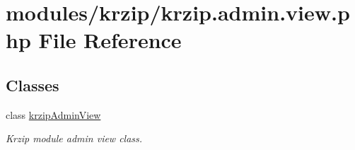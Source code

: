 \hypertarget{krzip_8admin_8view_8php}{\section{modules/krzip/krzip.admin.\-view.\-php File Reference}
\label{krzip_8admin_8view_8php}
}
\subsection*{Classes}
\begin{DoxyCompactItemize}
\item 
class \hyperlink{classkrzipAdminView}{krzip\-Admin\-View}
\begin{DoxyCompactList}\small\item\em Krzip module admin view class. \end{DoxyCompactList}\end{DoxyCompactItemize}
